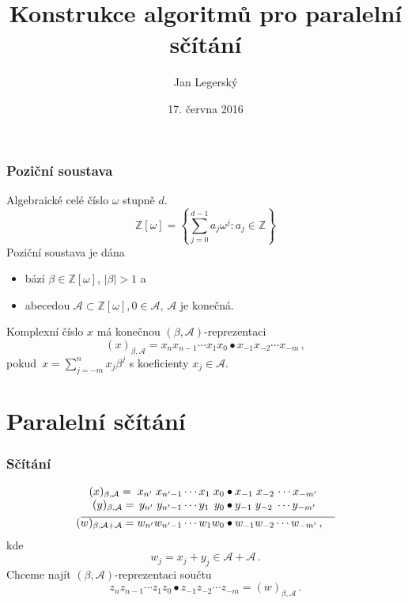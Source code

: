 \documentclass[11pt]{beamer}
\title{Konstrukce algoritmů pro paralelní sčítání}
\institute{%
					\rule{0cm}{0mm} \\
					\rule{0cm}{0mm}\\
					Školitel: Ing. Štěpán Starosta, PhD. \\
           	\rule{0cm}{0mm} \\
					Státní závěrečné zkoušky}
\author{Jan Legersk\'y}
\date{17. června 2016}
\newcommand{\Zomega}{\mathbb{Z}[\omega]}
\newcommand{\ZZ}{\mathbb{Z}}
\newcommand{\A}{\mathcal{A}}
\begin{document}
\begin{frame}
  \titlepage
\end{frame}

\begin{frame}
  \tableofcontents
\end{frame}



\begin{frame}
  \frametitle{Poziční soustava}
  Algebraické celé číslo $\omega$ stupně $d$.
  $$\Zomega= \left\{\sum_{j=0}^{d-1} a_j \omega^j \colon  a_j \in \ZZ \right\}$$
  \pause
  Poziční soustava je dána
  \begin{itemize}
    \item bází $\beta \in \Zomega$, $|\beta|>1$ a
    \item abecedou $\A \subset \Zomega , 0\in \A$, $\A$ je konečná. 
  \end{itemize}  
  \pause
  Komplexní číslo $x$ má konečnou  $(\beta, \A)$-reprezentaci
    $$
    (x)_{\beta,\A}=x_n x_{n-1}\cdots x_1 x_0 \bullet x_{-1} x_{-2} \cdots x_{-m}\,,
  $$ 
  pokud~$x=\sum_{j=-m}^n x_j \beta^j$ s koeficienty $x_j\in\A$.

\end{frame}

\section{Paralelní sčítání}
\begin{frame}
  \frametitle{Sčítání}
    \begin{align*}
  (x)_{\beta,\A}=\;x_{n'} \;x_{{n'}-1}\cdots x_1 \;x_0 &\bullet x_{-1} \;x_{-2}\, \cdots x_{-m'} \\[-3pt]
  (y)_{\beta,\A}=\,y_{n'} \;y_{{n'}-1}\cdots y_1 \,\;y_0 &\bullet y_{-1} \;y_{-2} \;\cdots y_{-m'} \\[-7pt]
    \line(1,0){130} & \line(1,0){100} \\[-7pt]
  (w)_{\beta,\A+\A}=w_{n'} w_{{n'}-1}\cdots w_1 w_0 &\bullet w_{-1} w_{-2} \cdots w_{-m'}\,,
  \end{align*}
  kde
  $$
    w_j=x_j+y_j \in \A +\A\,.
  $$
  \pause
  Chceme najít $(\beta,\A)$-reprezentaci součtu
  $$
    z_{n} z_{n-1}\cdots z_1 z_0 \bullet z_{-1} z_{-2} \cdots z_{-m}=(w)_{\beta,\A}\,.
  $$ 
\end{frame}
\end{document}
